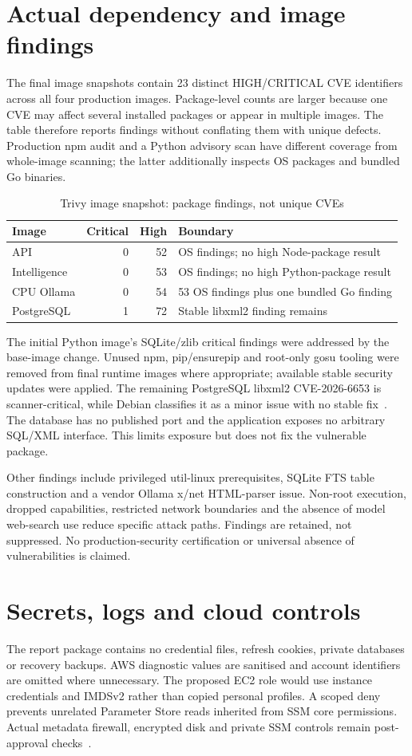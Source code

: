 \section{Actual dependency and image findings}
The final image snapshots contain 23 distinct HIGH/CRITICAL CVE identifiers across all four production images. Package-level counts are larger because one CVE may affect several installed packages or appear in multiple images. The table therefore reports findings without conflating them with unique defects. Production npm audit and a Python advisory scan have different coverage from whole-image scanning; the latter additionally inspects OS packages and bundled Go binaries.
\par\begin{table}[htbp]\caption{Trivy image snapshot: package findings, not unique CVEs}\label{tab:security}\small\begin{tabularx}{\linewidth}{YrrY}\toprule Image&Critical&High&Boundary\\\midrule
API&0&52&OS findings; no high Node-package result\\
Intelligence&0&53&OS findings; no high Python-package result\\
CPU Ollama&0&54&53 OS findings plus one bundled Go finding\\
PostgreSQL&1&72&Stable libxml2 finding remains\\\bottomrule\end{tabularx}\end{table}\par
The initial Python image's SQLite/zlib critical findings were addressed by the base-image change. Unused npm, pip/ensurepip and root-only gosu tooling were removed from final runtime images where appropriate; available stable security updates were applied. The remaining PostgreSQL libxml2 CVE-2026-6653 is scanner-critical, while Debian classifies it as a minor issue with no stable fix~\cite{libxml}. The database has no published port and the application exposes no arbitrary SQL/XML interface. This limits exposure but does not fix the vulnerable package.

Other findings include privileged util-linux prerequisites, SQLite FTS table construction and a vendor Ollama x/net HTML-parser issue. Non-root execution, dropped capabilities, restricted network boundaries and the absence of model web-search use reduce specific attack paths. Findings are retained, not suppressed. No production-security certification or universal absence of vulnerabilities is claimed.
\section{Secrets, logs and cloud controls}
The report package contains no credential files, refresh cookies, private databases or recovery backups. AWS diagnostic values are sanitised and account identifiers are omitted where unnecessary. The proposed EC2 role would use instance credentials and IMDSv2 rather than copied personal profiles. A scoped deny prevents unrelated Parameter Store reads inherited from SSM core permissions. Actual metadata firewall, encrypted disk and private SSM controls remain post-approval checks~\cite{imds,ssmsession}.
\FloatBarrier
